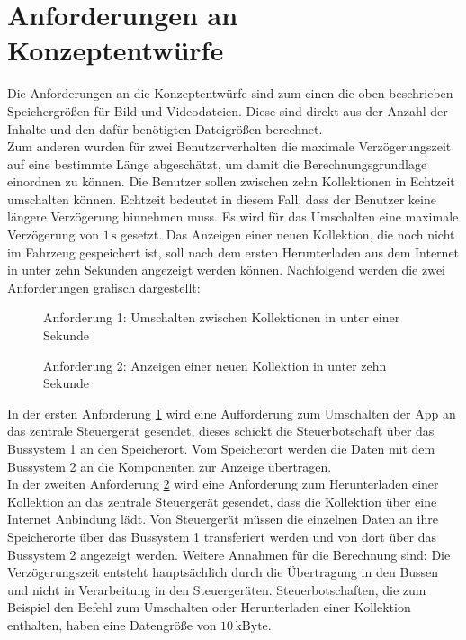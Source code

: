 \section{Anforderungen an Konzeptentwürfe}
Die Anforderungen an die Konzeptentwürfe sind zum einen die oben beschrieben Speichergrößen für Bild und Videodateien. Diese sind direkt aus der Anzahl der Inhalte und den dafür benötigten Dateigrößen berechnet. \\
Zum anderen wurden für zwei Benutzerverhalten die maximale Verzögerungszeit auf eine bestimmte Länge abgeschätzt, um damit die Berechnungsgrundlage einordnen zu können. Die Benutzer sollen zwischen zehn Kollektionen in Echtzeit umschalten können. Echtzeit bedeutet in diesem Fall, dass der Benutzer keine längere Verzögerung hinnehmen muss. Es wird für das Umschalten eine maximale Verzögerung von $ 1\,\mathrm{s} $ gesetzt.
Das Anzeigen einer neuen Kollektion, die noch nicht im Fahrzeug gespeichert ist, soll nach dem ersten Herunterladen aus dem Internet in unter zehn Sekunden angezeigt werden können.
Nachfolgend werden die zwei Anforderungen grafisch dargestellt:
\begin{figure}[]
	\centering
	
	\caption[Anforderung 1: Umschalten zwischen Kollektionen in unter einer Sekunde]{Anforderung 1: Umschalten zwischen Kollektionen in unter einer Sekunde}
	\label{fig:anforderung1}
\end{figure}
\begin{figure}[]
	\centering
	
	\caption[Anforderung 2: Anzeigen einer neuen Kollektion in unter zehn Sekunde]{Anforderung 2: Anzeigen einer neuen Kollektion in unter zehn Sekunde}
	\label{fig:anforderung2}
\end{figure}
In der ersten Anforderung \ref{fig:anforderung1} wird eine Aufforderung zum Umschalten der App an das zentrale Steuergerät gesendet, dieses schickt die Steuerbotschaft über das Bussystem 1 an den Speicherort. Vom Speicherort werden die Daten mit dem Bussystem 2 an die Komponenten zur Anzeige übertragen. \\
In der zweiten Anforderung \ref{fig:anforderung2} wird eine Anforderung zum Herunterladen einer Kollektion an das zentrale Steuergerät gesendet, dass die Kollektion über eine Internet Anbindung lädt. Von Steuergerät müssen die einzelnen Daten an ihre Speicherorte über das Bussystem 1 transferiert werden und von dort über das Bussystem 2 angezeigt werden.
Weitere Annahmen für die Berechnung sind: 
Die Verzögerungszeit entsteht hauptsächlich durch die Übertragung in den Bussen und nicht in Verarbeitung in den Steuergeräten.
Steuerbotschaften, die zum Beispiel den Befehl zum Umschalten oder Herunterladen einer Kollektion enthalten, haben eine Datengröße von $ 10\,\mathrm{kByte} $.
